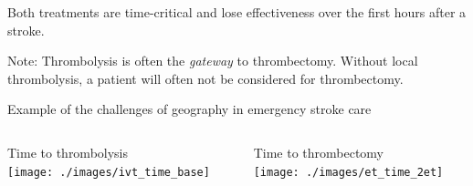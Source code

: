\documentclass{beamer}
\begin{document}
\begin{frame}
\begin{columns}[t]
\end{columns}

\vspace{3mm}
\footnotesize{Both treatments are time-critical and lose effectiveness over the first hours after a stroke.}

\vspace{3mm}
\footnotesize{Note: Thrombolysis is often the \emph{gateway} to thrombectomy. Without local thrombolysis, a patient will often not be considered for thrombectomy.}



\end{frame}


\begin{frame}{Example of the challenges of geography in emergency stroke care}

\begin{columns}
    \begin{column}{0.5\textwidth}
        \begin{center}
        Time to thrombolysis\\   
        \vspace{3mm}
        \texttt{[image: ./images/ivt\_time\_base]}
        \end{center}        
    \end{column}
    
    \begin{column}{0.5\textwidth}
        \begin{center}
        Time to thrombectomy\\     
        \vspace{3mm}
        \texttt{[image: ./images/et\_time\_2et]}
        \end{center}   
    
    \end{column}
\end{columns}
\end{frame}

\end{document}
